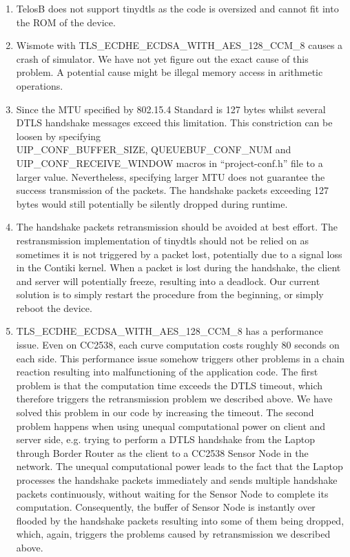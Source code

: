 \begin{enumerate}
	\item TelosB does not support tinydtls as the code is oversized and cannot fit into the ROM of the device.
	\item Wismote with TLS\_ECDHE\_ECDSA\_WITH\_AES\_128\_CCM\_8 causes a crash of simulator. We have not yet figure out the exact cause of this problem. A potential cause might be illegal memory access in arithmetic operations.
	\item Since the MTU specified by 802.15.4 Standard is 127 bytes whilst several DTLS handshake messages exceed this limitation. This constriction can be loosen by specifying\\ UIP\_CONF\_BUFFER\_SIZE, QUEUEBUF\_CONF\_NUM and UIP\_CONF\_RECEIVE\_WINDOW macros in ``project-conf.h'' file to a larger value. Nevertheless, specifying larger MTU does not guarantee the success transmission of the packets. The handshake packets exceeding 127 bytes would still potentially be silently dropped during runtime.
	\item The handshake packets retransmission should be avoided at best effort. The restransmission implementation of tinydtls should not be relied on as sometimes it is not triggered by a packet lost, potentially due to a signal loss in the Contiki kernel. When a packet is lost during the handshake, the client and server will potentially freeze, resulting into a deadlock. Our current solution is to simply restart the procedure from the beginning, or simply reboot the device.
	\item TLS\_ECDHE\_ECDSA\_WITH\_AES\_128\_CCM\_8 has a performance issue. Even on CC2538, each curve computation costs roughly 80 seconds on each side. This performance issue somehow triggers other problems in a chain reaction resulting into malfunctioning of the application code. The first problem is that the computation time exceeds the DTLS timeout, which therefore triggers the retransmission problem we described above. We have solved this problem in our code by increasing the timeout. The second problem happens when using  unequal computational power on client and server side, e.g. trying to perform a DTLS handshake from the Laptop through Border Router as the client to a CC2538 Sensor Node in the network. The unequal computational power leads to the fact that the Laptop processes the handshake packets immediately and sends multiple handshake packets continuously, without waiting for the Sensor Node to complete its computation. Consequently, the buffer of Sensor Node is instantly over flooded by the handshake packets resulting into some of them being dropped, which, again, triggers the problems caused by retransmission we described above. 
\end{enumerate}

